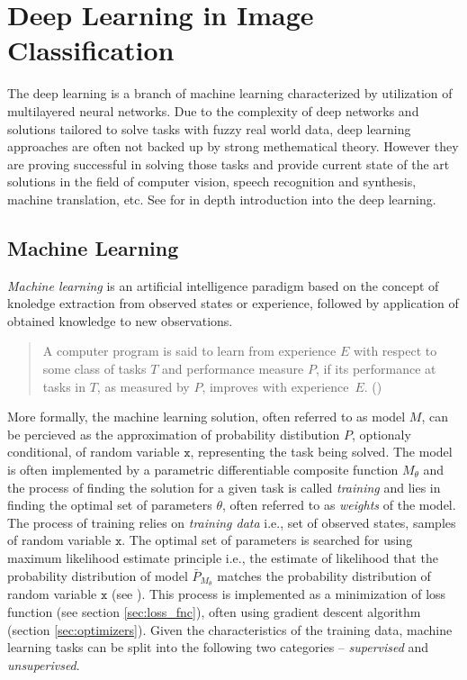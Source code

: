 \section{Deep Learning in Image Classification}
\label{sec:deep_learning}
The deep learning is a branch of machine learning characterized by utilization of multilayered neural networks. Due to the complexity of deep networks and solutions tailored to solve tasks with fuzzy real world data, deep learning approaches are often not backed up by strong methematical theory. However they are proving successful in solving those tasks and provide current state of the art solutions in the field of computer vision, speech recognition and synthesis, machine translation, etc. See \cite{Goodfellow-et-al-2016} for in depth introduction into the deep learning.

\subsection{Machine Learning}
\emph{Machine learning} is an artificial intelligence paradigm based on the concept of knoledge extraction from observed states or experience, followed by application of obtained knowledge to new observations.

\begin{quotation}
A computer program is said to learn from experience $E$ with respect to some class of tasks $T$ and performance measure $P$, if its performance at tasks in $T$, as measured by $P$, improves with experience~$E$. (\cite{Mitchell-1997})
\end{quotation}

\noindent More formally, the machine learning solution, often referred to as model $M$, can be percieved as the approximation of probability distibution $P$, optionaly conditional, of random variable $\mathtt{x}$, representing the task being solved. The model is often implemented by a parametric differentiable composite function $M_\theta$ and the process of finding the solution for a given task is called \emph{training} and lies in finding the optimal set of parameters $\theta$, often referred to as \emph{weights} of the model. The process of training relies on \emph{training data} i.e., set of observed states, samples of random variable $\mathtt{x}$. The optimal set of parameters is searched for using maximum likelihood estimate principle i.e., the estimate of likelihood that the probability distribution of model $\bar{P}_{M_\theta}$ matches the probability distribution of random variable $\mathtt{x}$ (see \cite{ml_flach}). This process is implemented as a minimization of loss function (see section \ref{sec:loss_fnc}), often using gradient descent algorithm (section \ref{sec:optimizers}). Given the characteristics of the training data, machine learning tasks can be split into the following two categories -- \emph{supervised} and \emph{unsuperivsed}.

